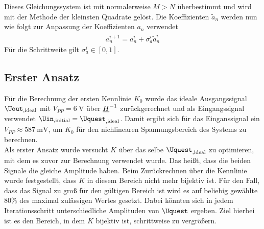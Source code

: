\documentclass[../Report.tex]{subfiles}
\begin{document}
Dieses Gleichungssystem ist mit normalerweise $M>N$ überbestimmt und wird mit der Methode der kleinsten Quadrate gelöst. Die Koeffizienten $\tilde{a}_n$ werden nun wie folgt zur Anpassung der Koeffizienten $a_n$ verwendet
\begin{align}
	\label{eq:opt.adjusta}
	a_n^{i+1} = a_n^{i} + \sigma_{a}^{i} \tilde{a}_n^{i}
\end{align}
Für die Schrittweite gilt $\sigma_{a}^i \in \left[ 0 , 1 \right]$.

\subsection{Erster Ansatz}
\label{subsec:opt.adjusta.results}
Für die Berechnung der ersten Kennlinie $K_0$ wurde das ideale Ausgangssignal $\Uout_{, \mathrm{ideal}}$ mit $V_{PP} = \SI{6}{\V}$ über $\underline{H}^{-1}$ zurückgerechnet und als Eingangssignal verwendet $\Uin_{, \mathrm{initial }} = \Uquest_{, \mathrm{ideal}}$. Damit ergibt sich für das Einganssignal ein $V_{PP} \approx \SI{587}{\mV}$, um $K_0$ für den nichlinearen Spannungsbereich des Systems zu berechnen.\\
Als erster Ansatz wurde versucht $K$ über das selbe $\Uquest_{, \mathrm{ideal}}$ zu optimieren, mit dem es zuvor zur Berechnung verwendet wurde. Das heißt, dass die beiden Signale die gleiche Amplitude haben. Beim Zurückrechnen über die Kennlinie wurde festgestellt, dass $K$ in diesem Bereich nicht mehr bijektiv ist. Für den Fall, dass das Signal zu groß für den gültigen Bereich ist wird es auf beliebig gewählte $80\%$ des maximal zulässigen Wertes gesetzt. Dabei könnten sich in jedem Iterationsschritt unterschiedliche Amplituden von $\Uquest$ ergeben. Ziel hierbei ist es den Bereich, in dem $K$ bijektiv ist, schrittweise zu vergrößern.
\end{document}
